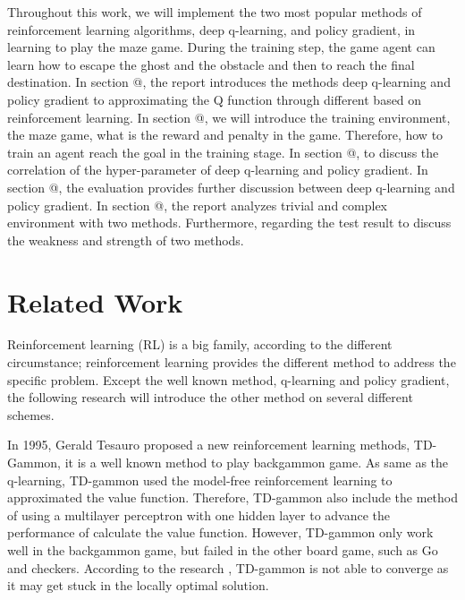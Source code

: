 \documentclass[article]{aaltoseries}
\makeatletter
\newcommand*{\rom}[1]{\expandafter\@slowromancap\romannumeral #1@}
\makeatother
\begin{document}
Throughout this work, we will implement the two most popular methods of reinforcement learning algorithms, deep q-learning, and policy gradient, in learning to play the maze game. During the training step, the game agent can learn how to escape the ghost and the obstacle and then to reach the final destination. In section \rom{3}, the report introduces the methods deep q-learning and policy gradient \cite{mnih2015humanlevel} to approximating the Q function through different based on reinforcement learning. In section \rom{4}, we will introduce the training environment, the maze game, what is the reward and penalty in the game. Therefore, how to train an agent reach the goal in the training stage. In section \rom{5}, to discuss the correlation of the hyper-parameter of deep q-learning and policy gradient. In section \rom{6}, the evaluation provides further discussion between deep q-learning and policy gradient. In section \rom{7}, the report analyzes trivial and complex environment with two methods. Furthermore, regarding the test result to discuss the weakness and strength of two methods.





\section{Related Work}

Reinforcement learning (RL) is a big family, according to the different circumstance; reinforcement learning provides the different method to address the specific problem. Except the well known method, q-learning and policy gradient, the following research will introduce the other method on several different schemes.

In 1995, Gerald Tesauro \cite{Tesauro:1995:TDL:203330.203343} proposed a new reinforcement learning methods, TD-Gammon, it is a well known method to play backgammon game. As same as the q-learning, TD-gammon used the model-free reinforcement learning to approximated the value function. Therefore, TD-gammon also include the method of using a multilayer perceptron with one hidden layer to advance the performance of calculate the value function. However, TD-gammon only work well in the backgammon game, but failed in the other board game, such as Go and checkers. According to the research \cite{Tesauro1992}, TD-gammon is not able to converge as it may get stuck in the locally optimal solution.
 
\end{document}
